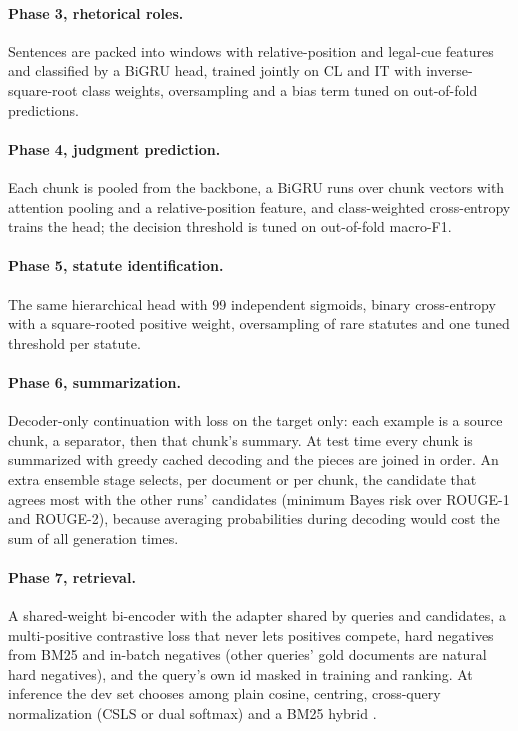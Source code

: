 \documentclass[11pt, oneside]{article}
\begin{document}
\paragraph{Phase 3, rhetorical roles.} Sentences are packed into windows with relative-position and legal-cue features and classified by a BiGRU \cite{cho2014gru} head, trained jointly on CL and IT with inverse-square-root class weights, oversampling and a bias term tuned on out-of-fold predictions.

\paragraph{Phase 4, judgment prediction.} Each chunk is pooled from the backbone, a BiGRU runs over chunk vectors with attention pooling and a relative-position feature, and class-weighted cross-entropy trains the head; the decision threshold is tuned on out-of-fold macro-F1.

\paragraph{Phase 5, statute identification.} The same hierarchical head with 99 independent sigmoids, binary cross-entropy with a square-rooted positive weight, oversampling of rare statutes and one tuned threshold per statute.

\paragraph{Phase 6, summarization.} Decoder-only continuation with loss on the target only: each example is a source chunk, a separator, then that chunk's summary. At test time every chunk is summarized with greedy cached decoding and the pieces are joined in order. An extra ensemble stage selects, per document or per chunk, the candidate that agrees most with the other runs' candidates (minimum Bayes risk over ROUGE-1 and ROUGE-2), because averaging probabilities during decoding would cost the sum of all generation times.

\paragraph{Phase 7, retrieval.} A shared-weight bi-encoder with the adapter shared by queries and candidates, a multi-positive contrastive loss that never lets positives compete, hard negatives from BM25 and in-batch negatives (other queries' gold documents are natural hard negatives), and the query's own id masked in training and ranking. At inference the dev set chooses among plain cosine, centring, cross-query normalization (CSLS \cite{conneau2018csls} or dual softmax) and a BM25 hybrid \cite{robertson2009bm25}.
\end{document}
